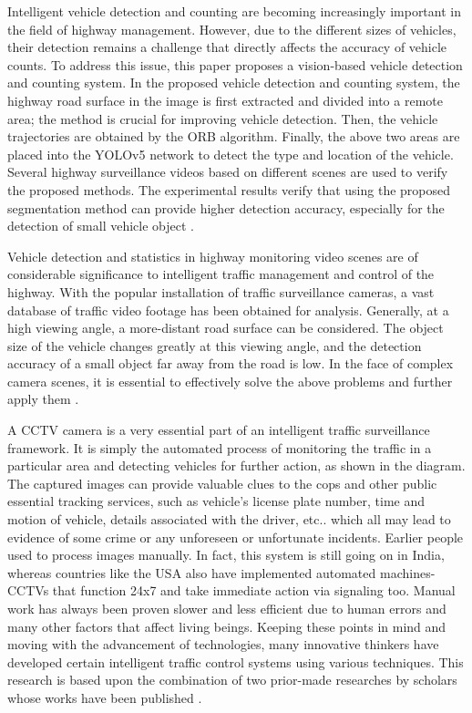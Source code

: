 \begin{sloppypar}
Intelligent vehicle detection and counting are becoming increasingly important in the field of highway management. However, due to the different sizes of vehicles, their detection remains a challenge that directly affects the accuracy of vehicle counts. To address this issue, this paper proposes a vision-based vehicle detection and counting system. In the proposed vehicle detection and counting system, the highway road surface in the image is first extracted and divided into a remote area; the method is crucial for improving vehicle detection. Then, the vehicle trajectories are obtained by the ORB algorithm. Finally, the above two areas are placed into the YOLOv5 network to detect the type and location of the vehicle. Several highway surveillance videos based on different scenes are used to verify the proposed methods. The experimental results verify that using the proposed segmentation method can provide higher detection accuracy, especially for the detection of small vehicle object \cite{SongH2019}. 

Vehicle detection and statistics in highway monitoring video scenes are of considerable significance to intelligent traffic management and control of the highway. With the popular installation of traffic surveillance cameras, a vast database of traffic video footage has been obtained for analysis. Generally, at a high viewing angle, a more-distant road surface can be considered. The object size of the vehicle changes greatly at this viewing angle, and the detection accuracy of a small object far away from the road is low. In the face of complex camera scenes, it is essential to effectively solve the above problems and further apply them \cite{SongH2019}. 

A CCTV camera is a very essential part of an intelligent traffic surveillance framework. It is simply the automated process of monitoring the traffic in a particular area and detecting vehicles for further action, as shown in the diagram. The captured images can provide valuable clues to the cops and other public essential tracking services, such as vehicle’s license plate number, time and motion of vehicle, details associated with the driver, etc.. which all may lead to evidence of some crime or any unforeseen or unfortunate incidents. Earlier people used to process images manually. In fact, this system is still going on in India, whereas countries like the USA also have implemented automated machines- CCTVs that function 24x7 and take immediate action via signaling too. Manual work has always been proven slower and less efficient due to human errors and many other factors that affect living beings. Keeping these points in mind and moving with the advancement of technologies, many innovative thinkers have developed certain intelligent traffic control systems using various techniques. This research is based upon the combination of two prior-made researches by scholars whose works have been published \cite{Baran2016}.

\end{sloppypar}

